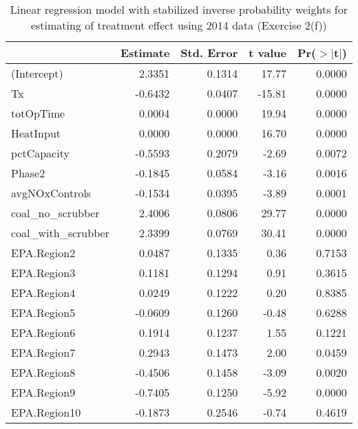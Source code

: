 \begin{table}[ht]
\centering
\begin{tabular}{lrrrr}
  \toprule
 & Estimate & Std. Error & t value & Pr($>$$|$t$|$) \\ 
  \midrule
(Intercept) & 2.3351 & 0.1314 & 17.77 & 0.0000 \\ 
  Tx & -0.6432 & 0.0407 & -15.81 & 0.0000 \\ 
  totOpTime & 0.0004 & 0.0000 & 19.94 & 0.0000 \\ 
  HeatInput & 0.0000 & 0.0000 & 16.70 & 0.0000 \\ 
  pctCapacity & -0.5593 & 0.2079 & -2.69 & 0.0072 \\ 
  Phase2 & -0.1845 & 0.0584 & -3.16 & 0.0016 \\ 
  avgNOxControls & -0.1534 & 0.0395 & -3.89 & 0.0001 \\ 
  coal\_no\_scrubber & 2.4006 & 0.0806 & 29.77 & 0.0000 \\ 
  coal\_with\_scrubber & 2.3399 & 0.0769 & 30.41 & 0.0000 \\ 
  EPA.Region2 & 0.0487 & 0.1335 & 0.36 & 0.7153 \\ 
  EPA.Region3 & 0.1181 & 0.1294 & 0.91 & 0.3615 \\ 
  EPA.Region4 & 0.0249 & 0.1222 & 0.20 & 0.8385 \\ 
  EPA.Region5 & -0.0609 & 0.1260 & -0.48 & 0.6288 \\ 
  EPA.Region6 & 0.1914 & 0.1237 & 1.55 & 0.1221 \\ 
  EPA.Region7 & 0.2943 & 0.1473 & 2.00 & 0.0459 \\ 
  EPA.Region8 & -0.4506 & 0.1458 & -3.09 & 0.0020 \\ 
  EPA.Region9 & -0.7405 & 0.1250 & -5.92 & 0.0000 \\ 
  EPA.Region10 & -0.1873 & 0.2546 & -0.74 & 0.4619 \\ 
   \bottomrule
\end{tabular}
\caption{Linear regression model with stabilized inverse probability weights for estimating of treatment effect using 2014 data (Exercise 2(f))} 
\label{tab:lm-2f-14}
\end{table}


